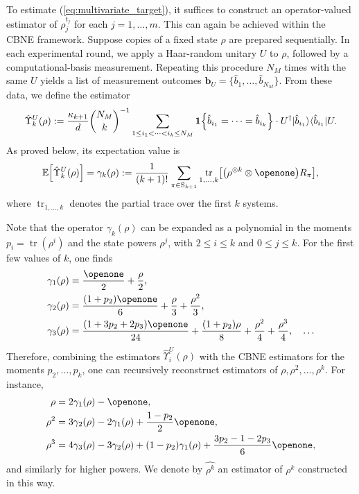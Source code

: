 \documentclass[aps,prl,twocolumn,nofootinbib,superscriptaddress,10pt]{revtex4-2}
\let\originalleft\left
\let\originalright\right
\renewcommand{\left}{\mathopen{}\mathclose\bgroup\originalleft}
\renewcommand{\right}{\aftergroup\egroup\originalright}
\def\E{ {\mathbb E} } %
\def\>{\rangle}
\def\<{\langle}
\DeclareMathOperator{\Tr}{tr}
\theoremstyle{plain}
\theoremstyle{definition}
\def\eqref#1{\textup{(\ref{#1})}}
\begin{document}
To estimate \eqref{eq:multivariate_target}, it suffices to construct  an operator-valued estimator of $\rho_j^{t_j}$ for each $j=1,\dots,m$. 
This can again be achieved within the CBNE framework. 
Suppose copies of a fixed state $\rho$ are prepared sequentially. 
In each experimental round, we apply a Haar-random unitary $U$ to $\rho$, followed by a computational-basis measurement. 
Repeating this procedure $N_M$ times with the same $U$ yields a list of measurement outcomes
$\mathbf{b}_U=\{\hat b_1,\dots,\hat b_{N_M}\}$.
From these data, we define the estimator
\begin{align}\label{eq:defUpsilon}
\hat{\Upsilon}_k^{U} (\rho) :=    
\frac{ \kappa_{k+1}}{d}  \binom{N_M}{k}^{-1}
\sum_{ 1\leq i_1 < \dots < i_k \leq N_M} 
\textbf{1}\left\{\hat{b}_{i_1}=\dots=\hat{b}_{i_k}\right\} \cdot U^{\dag}|\hat{b}_{i_1}\>\<\hat{b}_{i_1}|U .  
\end{align}
As proved below, its expectation value is
\begin{align}\label{eq:expUpsilon}
\E \left[ \hat{\Upsilon}_k^{U} (\rho) \right] 
=\gamma_k(\rho):=
\frac{1 }{(k+1)! } \sum_{\pi\in \mathrm{S}_{k+1}}  \Tr_{1,\dots,k}\left[ \left(\rho^{\otimes k} \otimes \openone \right)R_\pi\right], 
\end{align}
where $\Tr_{1,\dots,k}$ denotes the partial trace over the first $k$ systems. 


Note that the operator $\gamma_k(\rho)$ can be expanded as a polynomial in the moments $p_i=\Tr(\rho^i)$
and the state powers $\rho^j$, with $2\le i\le k$ and $0\le j\le k$. 
For the first few values of $k$, one finds
\begin{align}\label{eq:gammaExpan}
\gamma_1(\rho) &= \frac{\openone}{2}+\frac{\rho}{2}, 
\nonumber \\   
\gamma_2(\rho) &= \frac{(1+p_2)\openone}{6}+\frac{\rho}{3}+\frac{\rho^2}{3},
\nonumber \\ 
\gamma_3(\rho) &= \frac{(1+3p_2+2p_3) \openone}{24} + \frac{(1+p_2) \rho}{8} + \frac{\rho^2}{4} +\frac{\rho^3}{4}, 
\quad   \dots   
\end{align}
Therefore, combining the estimators $\hat\Upsilon_i^U(\rho)$ with the CBNE estimators for the moments $p_2,\dots,p_k$, one can recursively reconstruct estimators of $\rho,\rho^2,\dots,\rho^k$. 
For instance,
\begin{align}
\rho &= 2\gamma_1(\rho)-\openone, 
\nonumber \\
\rho^2 &= 3\gamma_2(\rho)-2\gamma_1(\rho)+\frac{1-p_2}{2}\openone,
\nonumber \\
\rho^3
&=
4\gamma_3(\rho)
-3\gamma_2(\rho)
+(1-p_2)\gamma_1(\rho)
+\frac{3p_2-1-2p_3}{6}\openone, 
\end{align}
and similarly for higher powers. 
We denote by $\widehat{\rho^k}$ an estimator of $\rho^k$ constructed in this way.
\end{document}
